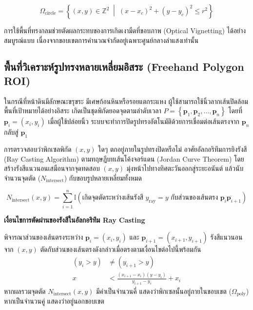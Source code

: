 \begin{equation}
\Omega_{\text{circle}} = \left\{ (x, y) \in \mathbb{Z}^2 \;\middle|\; (x - x_c)^2 + (y - y_c)^2 \le r^2 \right\}
\end{equation}

การใช้พื้นที่ทรงกลมช่วยตัดผลกระทบของการเกิดเงามืดที่ขอบภาพ (Optical Vignetting) ได้อย่างสมบูรณ์แบบ เนื่องจากขอบเขตการคำนวณจำกัดอยู่เฉพาะศูนย์กลางลำแสงเท่านั้น

\subsection{พื้นที่วิเคราะห์รูปทรงหลายเหลี่ยมอิสระ (Freehand Polygon ROI)}
ในกรณีที่หน้าดินมีลักษณะขรุขระ มีเศษก้อนหินหรือรอยแตกระแหง ผู้ใช้สามารถใช้นิ้วลากเส้นปิดล้อมพื้นที่เป้าหมายได้อย่างอิสระ เกิดเป็นชุดพิกัดยอดจุดตามลำดับเวลา $P = \left\{ \mathbf{p}_1, \mathbf{p}_2, \dots, \mathbf{p}_n \right\}$ โดยที่ $\mathbf{p}_i = (x_i, y_i)$ เมื่อผู้ใช้ปล่อยนิ้ว ระบบจะทำการปิดรูปทรงอัตโนมัติด้วยการเชื่อมต่อเส้นตรงจาก $\mathbf{p}_n$ กลับสู่ $\mathbf{p}_1$

การตรวจสอบว่าพิกเซลพิกัด $(x, y)$ ใดๆ ตกอยู่ภายในรูปทรงปิดหรือไม่ อาศัยอัลกอริทึมการยิงรังสี (Ray Casting Algorithm) ตามทฤษฎีบทเส้นโค้งจอร์แดน (Jordan Curve Theorem) โดยสร้างรังสีแนวนอนเสมือนจากจุดทดสอบ $(x, y)$ มุ่งหน้าไปทางทิศตะวันออกสู่ระยะอนันต์ แล้วนับจำนวนจุดตัด ($N_{\text{intersect}}$) กับขอบรูปหลายเหลี่ยมทั้งหมด

\begin{equation}
N_{\text{intersect}}(x, y) = \sum_{i=1}^{n} \mathbb{I}\left( \text{เกิดจุดตัดระหว่างเส้นรังสี } y_{\text{ray}} = y \text{ กับส่วนของเส้นตรง } \overline{\mathbf{p}_i \mathbf{p}_{i+1}} \right)
\end{equation}

\begin{theorybox}
\textbf{เงื่อนไขการตัดผ่านของรังสีในอัลกอริทึม Ray Casting}\par
พิจารณาส่วนของเส้นตรงระหว่าง $\mathbf{p}_i = (x_i, y_i)$ และ $\mathbf{p}_{i+1} = (x_{i+1}, y_{i+1})$ รังสีแนวนอนจาก $(x, y)$ ตัดกับส่วนของเส้นตรงดังกล่าวเมื่อตรงตามเงื่อนไขต่อไปนี้พร้อมกัน
\begin{align}
(y_i > y) &\neq (y_{i+1} > y) \\
x &< \frac{(x_{i+1} - x_i)(y - y_i)}{y_{i+1} - y_i} + x_i
\end{align}
หากผลรวมจุดตัด $N_{\text{intersect}}(x, y)$ มีค่าเป็นจำนวนคี่ แสดงว่าพิกเซลนั้นอยู่ภายในขอบเขต ($\Omega_{\text{poly}}$) หากเป็นจำนวนคู่ แสดงว่าอยู่นอกขอบเขต
\end{theorybox}

